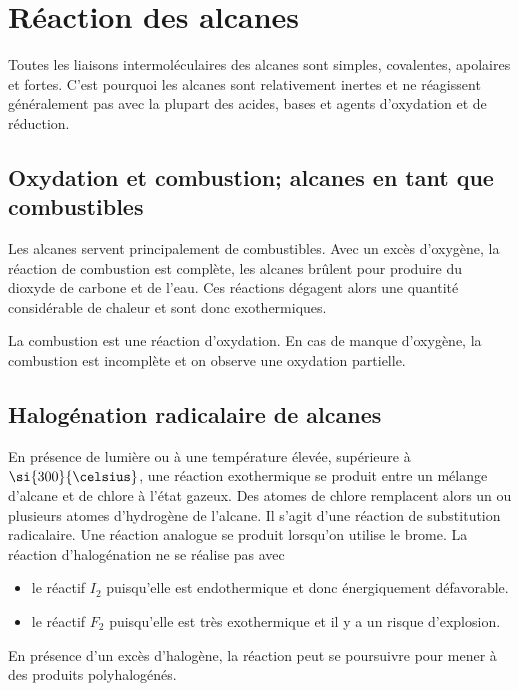 \section{Réaction des alcanes}

Toutes les liaisons intermoléculaires des alcanes sont simples, covalentes, apolaires et fortes.
C'est pourquoi les alcanes sont relativement inertes et ne réagissent généralement pas avec la plupart des acides, bases et agents d'oxydation et de réduction.

\subsection{Oxydation et combustion; alcanes en tant que combustibles}Les alcanes servent principalement de combustibles.
Avec un excès d'oxygène, la réaction de combustion est complète, les alcanes brûlent pour produire du dioxyde de carbone et de l'eau.
Ces réactions dégagent alors une quantité considérable de chaleur et sont donc exothermiques.

La combustion est une réaction d'oxydation.
En cas de manque d'oxygène, la combustion est incomplète et on observe une oxydation partielle.

\subsection{Halogénation radicalaire de alcanes}

En présence de lumière ou à une température élevée, supérieure à $\si{300}{\celsius}$, une réaction exothermique se produit entre un mélange d'alcane et de chlore à l'état gazeux.
Des atomes de chlore remplacent alors un ou plusieurs  atomes d'hydrogène de l'alcane.
Il s'agit d'une réaction de substitution radicalaire.
Une réaction analogue se produit lorsqu'on utilise le brome.
La réaction d'halogénation ne se réalise pas avec
\begin{itemize}
  \item le réactif $I_2$ puisqu'elle est endothermique et donc énergiquement défavorable.
  \item le réactif $F_2$ puisqu'elle est très exothermique et il y a un risque d'explosion.
\end{itemize}

En présence d'un excès d'halogène, la réaction peut se poursuivre pour mener à des produits polyhalogénés.

